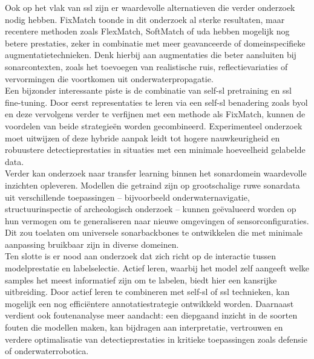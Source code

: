 Ook op het vlak van \gls{ssl} zijn er waardevolle alternatieven die verder onderzoek nodig hebben. FixMatch toonde in dit onderzoek al sterke resultaten, maar recentere methoden zoals FlexMatch, SoftMatch of \gls{uda} hebben mogelijk nog betere prestaties, zeker in combinatie met meer geavanceerde of domeinspecifieke augmentatietechnieken. Denk hierbij aan augmentaties die beter aansluiten bij sonarcontexten, zoals het toevoegen van realistische ruis, reflectievariaties of vervormingen die voortkomen uit onderwaterpropagatie. \\

Een bijzonder interessante piste is de combinatie van \gls{self-sl} pretraining en \gls{ssl} fine-tuning. Door eerst representaties te leren via een \gls{self-sl} benadering zoals \gls{byol} en deze vervolgens verder te verfijnen met een methode als FixMatch, kunnen de voordelen van beide strategieën worden gecombineerd. Experimenteel onderzoek moet uitwijzen of deze hybride aanpak leidt tot hogere nauwkeurigheid en robuustere detectieprestaties in situaties met een minimale hoeveelheid gelabelde data. \\

Verder kan onderzoek naar transfer learning binnen het sonardomein waardevolle inzichten opleveren. Modellen die getraind zijn op grootschalige ruwe sonardata uit verschillende toepassingen -- bijvoorbeeld onderwaternavigatie, structuurinspectie of archeologisch onderzoek -- kunnen geëvalueerd worden op hun vermogen om te generaliseren naar nieuwe omgevingen of sensorconfiguraties. Dit zou toelaten om universele sonarbackbones te ontwikkelen die met minimale aanpassing bruikbaar zijn in diverse domeinen. \\

Ten slotte is er nood aan onderzoek dat zich richt op de interactie tussen modelprestatie en labelselectie. Actief leren, waarbij het model zelf aangeeft welke samples het meest informatief zijn om te labelen, biedt hier een kansrijke uitbreiding. Door actief leren te combineren met \gls{self-sl} of \gls{ssl} technieken, kan mogelijk een nog efficiëntere annotatiestrategie ontwikkeld worden. Daarnaast verdient ook foutenanalyse meer aandacht: een diepgaand inzicht in de soorten fouten die modellen maken, kan bijdragen aan interpretatie, vertrouwen en verdere optimalisatie van detectieprestaties in kritieke toepassingen zoals defensie of onderwaterrobotica.